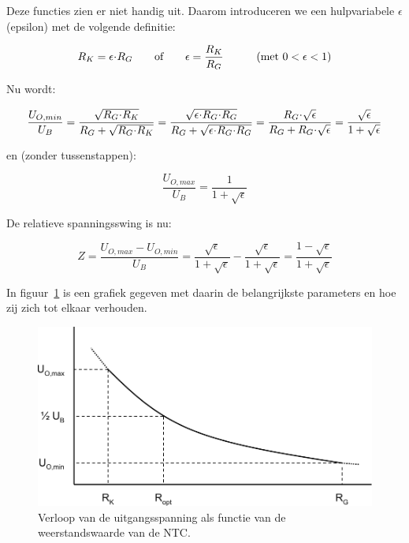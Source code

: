 \documentclass[12pt,a4paper,final,twoside,fleqn]{article}
\let\oldcdot\cdot
\renewcommand{\cdot}{\kern-.10em\oldcdot\kern-.10em}
\begin{document}
Deze functies zien er niet handig uit. Daarom introduceren we een hulpvariabele
$\epsilon$ (epsilon) met de volgende definitie:

\begin{equation}
R_K = \epsilon\cdot R_G \qquad\text{of}\qquad \epsilon=\dfrac{R_K}{R_G}
\qquad\quad\text{(met } 0<\epsilon <1)
\end{equation}

Nu wordt:

\begin{equation}
\label{equ:uominub}
\dfrac{U_{O,min}}{U_B} = \dfrac{\sqrt{R_G\cdot R_K}}{R_G + \sqrt{R_G\cdot R_K}}
                       = \dfrac{\sqrt{\epsilon\cdot R_G\cdot R_G}}{R_G+\sqrt{\epsilon\cdot R_G\cdot R_G}}
                       = \dfrac{R_G\cdot\sqrt{\epsilon}}{R_G+R_G\cdot\sqrt{\epsilon}}
                       = \dfrac{\sqrt{\epsilon}}{1+\sqrt{\epsilon}}
\end{equation}

en (zonder tussenstappen):

\begin{equation}
\dfrac{U_{O,max}}{U_B} = \dfrac{1}{1+\sqrt{\epsilon}}
\end{equation}

De relatieve spanningsswing is nu:

\begin{equation}
\label{equ:resspanswing}
Z =
\dfrac{U_{O,max}-U_{O,min}}{U_B} =
\dfrac{\sqrt{\epsilon}}{1+\sqrt{\epsilon}} - \dfrac{\sqrt{\epsilon}}{1+\sqrt{\epsilon}} =
\dfrac{1 - \sqrt{\epsilon}}{1+\sqrt{\epsilon}}
\end{equation}

In figuur~\ref{fig:ntc_graph1} is een grafiek gegeven met daarin de belangrijkste
parameters en hoe zij zich tot elkaar verhouden.

\begin{figure}[ht!]
\centering
\includegraphics[scale=0.63]{drawings/ntc_graph1}
\caption{Verloop van de uitgangsspanning als functie van de weerstandswaarde van de NTC.}
\label{fig:ntc_graph1}
\end{figure}
\end{document}

